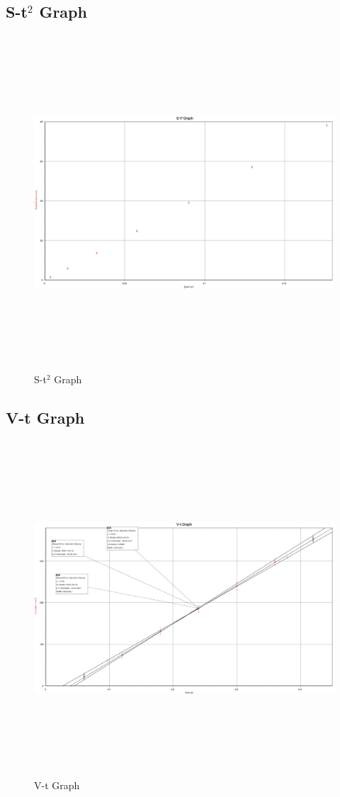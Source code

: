 \documentclass[12pt,a4paper]{article}
\begin{document}
\subsection{S-t$^2$ Graph}
\begin{figure}[H]
    \includegraphics[width = 16cm, height = 12.5cm]{S-t^2.png}
    \caption{S-t$^2$ Graph}
\end{figure}
\hypertarget{Graph1}{\subsection{V-t Graph}}
\begin{figure}[H]
    \centering
    \includegraphics[width = 16cm, height = 12.5cm]{V-t Graph.png}
    \caption{V-t Graph}
\end{figure}
\end{document}

